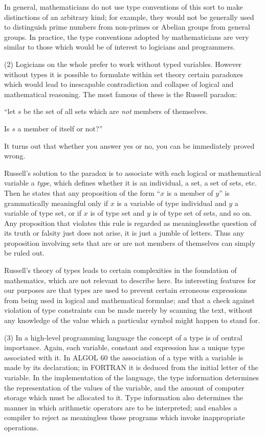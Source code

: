 In general, mathematicians do not use type conventions of this sort to make distinctions of an arbitrary kind; for example, they would not be generally used to distinguish prime numbers from non-primes or Abelian groups from general groups. In practice, the type conventions adopted by mathematicians are very similar to those which would be of interest to logicians and programmers.

(2) Logicians on the whole prefer to work without typed variables. However without types it is possible to formulate within set theory certain paradoxes which would lead to inescapable contradiction and collapse of logical and mathematical reasoning. The most famous of these is the Russell paradox:

\quad \hspace{-.4em}``let $s$ be the set of all sets which are \textit{not} members of themselves.

\quad Is $s$ a member of itself or not?''

\noindent
It turns out that whether you answer yes or no, you can be immediately proved wrong.

Russell's solution to the paradox is to associate with each logical or mathematical variable a \textit{type}, which defines whether it is an individual, a set, a set of sets, etc. Then he states that any proposition of the form ``$x$ is a member of $y$'' is grammatically meaningful only if $x$ is a variable of type individual and $y$ a variable of type set, or if $x$ is of type set and $y$ is of type set of sets, and so on. Any proposition that violates this rule is regarded as meaningless\textemdash{}the question of its truth or falsity just does not arise, it is just a jumble of letters. Thus any proposition involving sets that are or are not members of themselves can simply be ruled out.

Russell's theory of types leads to certain complexities in the foundation of mathematics, which are not relevant to describe here. Its interesting features for our purposes are that types are used to prevent certain erroneous expressions from being used in logical and mathematical formulae; and that a check against violation of type constraints can be made merely by scanning the text, without any knowledge of the value which a particular symbol might happen to stand for.

(3) In a high-level programming language the concept of a type is of central importance. Again, each variable, constant and expression has a unique type associated with it. In ALGOL 60 the association of a type with a variable is made by its declaration; in FORTRAN it is deduced from the initial letter of the variable. In the implementation of the language, the type information determines the representation of the values of the variable, and the amount of computer storage which must be allocated to it. Type information also determines the manner in which arithmetic operators are to be interpreted; and enables a compiler to reject as meaningless those programs which invoke inappropriate operations.

